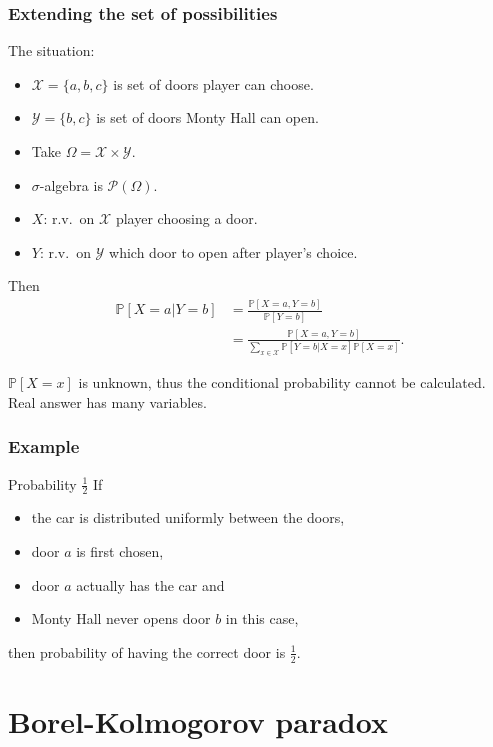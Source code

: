 \documentclass{beamer}
\theoremstyle{plain}
\theoremstyle{definition}
\theoremstyle{remark}
\renewcommand{\P}{\mathbb{P}}
\newcommand{\1}{\mathbbm{1}}
\begin{document}
\begin{frame}
\frametitle{Extending the set of possibilities}
The situation:
\begin{itemize}
	\item $\mathcal{X}=\{a,b,c\}$ is set of doors player can choose.
	\item $\mathcal{Y}=\{b,c\}$ is set of doors Monty Hall can open.
	\item Take $\Omega=\mathcal{X}\times\mathcal{Y}$.
	\item $\sigma$-algebra is $\mathcal{P}(\Omega)$.
	\item $X$: r.v.~on $\mathcal{X}$ player choosing a door.
	\item $Y$: r.v.~on $\mathcal{Y}$ which door to open after player's choice.
\end{itemize}
\pause

Then
\begin{align*}
\P[X=a|Y=b]&=\frac{\P[X=a,Y=b]}{\P[Y=b]}\\
&=\frac{\P[X=a,Y=b]}{\sum_{x\in \mathcal{X}}\P[Y=b|X=x]\P[X=x]}.
\end{align*}

$\P[X=x]$ is unknown, thus the conditional probability cannot be calculated. Real answer has many variables.
\end{frame}

\begin{frame}
\frametitle{Example}

\begin{exampleblock}{Probability $\frac{1}{2}$}
If
\begin{itemize}
\item the car is distributed uniformly between the doors,
\item door $a$ is first chosen, 
\item door $a$ actually has the car and
\item Monty Hall never opens door $b$ in this case,
\end{itemize}
then probability of having the correct door is $\frac{1}{2}$.
\end{exampleblock}
\end{frame}

\section{Borel-Kolmogorov paradox}
\end{document}

